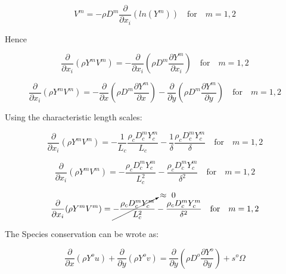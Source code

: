 \begin{equation} 
V^m=-\rho D^m\frac{\partial }{\partial x_i}(ln(Y^m))
\quad \text{for} \quad m=1,2
\end{equation} 

Hence

\begin{equation} 
\frac{\partial}{\partial x_i}(\rho Y^{m}V^m)=
-\frac{\partial}{\partial x_i}\left(\rho D^m\frac{\partial Y^m}{\partial x_i}\right)
\quad \text{for} \quad m=1,2
\end{equation} 

\begin{equation} 
\frac{\partial}{\partial x_i}(\rho Y^{m}V^m)=
-\frac{\partial}{\partial x}\left(\rho D^m\frac{\partial Y^m}{\partial x}\right)
-\frac{\partial}{\partial y}\left(\rho D^m\frac{\partial Y^m}{\partial y}\right)
\quad \text{for} \quad m=1,2
\end{equation} 

Using the characteristic length scales:

\begin{equation} 
\frac{\partial}{\partial x_i}(\rho Y^{m}V^m)=
-\frac{1}{ L_c}\frac{\rho_c D_c^mY_c^m}{L_c}
-\frac{1}{ \delta}\frac{\rho_c D_c^mY_c^m}{\delta}
\quad \text{for} \quad m=1,2
\end{equation} 

\begin{equation} 
\frac{\partial}{\partial x_i}(\rho Y^{m}V^m)=
-\frac{\rho_c D_c^mY_c^m}{ L_c^2}
-\frac{\rho_c D_c^mY_c^m}{ \delta^2}
\quad \text{for} \quad m=1,2
\end{equation} 

\begin{equation} 
\frac{\partial}{\partial x_i}(\rho Y^{m}V^m)=
\cancelto{\approx~0}{
-\frac{\rho_c D_c^mY_c^m}{ L_c^2}
}
-\frac{\rho_c D_c^mY_c^m}{ \delta^2}
\quad \text{for} \quad m=1,2
\end{equation} 

The Species conservation can be wrote as:

\begin{equation} 
\frac{\partial}{\partial x}(\rho Y^{o}u)+
\frac{\partial}{\partial y}(\rho Y^{o}v)=
\frac{\partial}{\partial y}\left(\rho D^o\frac{\partial Y^o}{\partial y}\right)+
s^{o}\Omega
\end{equation} 

